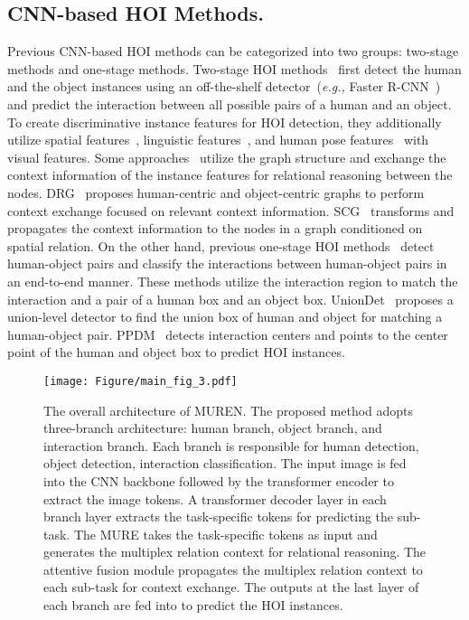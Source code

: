 \documentclass[10pt,twocolumn,letterpaper]{article}
\begin{document}
\subsection{CNN-based HOI Methods.}
Previous CNN-based HOI methods can be categorized into two groups: two-stage methods and one-stage methods.
Two-stage HOI methods~\cite{li2019tin,gao2020drg,gao2018ican,li2020IDN,qi2018dpnn,ulutan2020vsgnet,wang2020hetero,zhang2021spatially,hou2020vcl} first detect the human and the object instances using an off-the-shelf detector~(\textit{e.g.,} Faster R-CNN~\cite{ren2015faster}) and predict the interaction between all possible pairs of a human and an object. 
To create discriminative instance features for HOI detection, they additionally utilize spatial features~\cite{gao2018ican,spaital_learning,li2019tin}, linguistic features~\cite{liu2020consnet,gao2020drg}, and human pose features~\cite{li2019tin,gupta2019no} with visual features.
Some approaches~\cite{qi2018dpnn,gao2020drg,wang2020hetero,ulutan2020vsgnet,zhang2021spatially} utilize the graph structure and exchange the context information of the instance features for relational reasoning between the nodes.
DRG~\cite{gao2020drg} proposes human-centric and object-centric graphs to perform context exchange focused on relevant context information. SCG~\cite{zhang2021spatially} transforms and propagates the context information to the nodes in a graph conditioned on spatial relation.
On the other hand, previous one-stage HOI methods~\cite{kim2020uniondet,liao2020ppdm,fang2021dirv} detect human-object pairs and classify the interactions between human-object pairs in an end-to-end manner.
These methods utilize the interaction region to match the interaction and a pair of a human box and an object box. 
UnionDet~\cite{kim2020uniondet} proposes a union-level detector to find the union box of human and object for matching a human-object pair.
PPDM~\cite{liao2020ppdm} detects interaction centers and points to the center point of the human and object box to predict HOI instances.






\begin{figure*}[t]
\texttt{[image: Figure/main\_fig\_3.pdf]}
\caption{The overall architecture of MUREN. The proposed method adopts three-branch architecture: human branch, object branch, and interaction branch. Each branch is responsible for human detection, object detection, interaction classification. The input image is fed into the CNN backbone followed by the transformer encoder to extract the image tokens. A transformer decoder layer in each branch layer extracts the task-specific tokens for predicting the sub-task. The MURE takes the task-specific tokens as input and generates the multiplex relation context for relational reasoning. The attentive fusion module propagates the multiplex relation context to each sub-task for context exchange. The outputs at the last layer of each branch are fed into to predict the HOI instances.}
   \vspace{-3mm}
\label{fig:framework}
\end{figure*}
\end{document}
